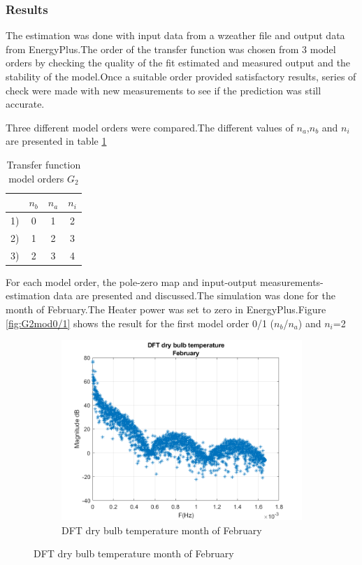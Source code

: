 \documentclass[a4paper,12pt]{report}
\numberwithin{equation}{section}
\begin{document}
\subsubsection{Results}
The estimation was done with input data from a wzeather file and output data from EnergyPlus.The order of the transfer function was chosen from 3 model orders by checking the quality of the fit estimated and measured output and the stability of the model.Once a suitable order provided satisfactory results, series of check were made with new measurements to see if the prediction was still accurate.

\noindent
Three different model orders were compared.The different values of  $n_{a}$,$n_{b}$ and $n_{i}$ are  presented in table \ref{table:model order G_{2}}

\begin{table}[H]
\centering
\begin{tabular}{|c|c|c|c|}
\hline  & $n_{b}$ & $n_{a}$ & $n_{i}$ \\
\hline 1) & 0 & 1 & 2 \\
\hline 2) & 1 & 2 & 3\\
\hline 3) & 2 & 3 & 4\\
\hline
\end{tabular}
\caption{Transfer function model orders $G_{2}$}
\label{table:model order G_{2}}
\end{table}

\noindent
For each model order, the pole-zero map and input-output measurements-estimation data  are presented and discussed.The simulation was done for the month of February.The Heater power was set to zero in EnergyPlus.Figure \ref{fig:G2mod0/1} shows the result for the first model order 0/1 ($n_{b}$/$n_{a}$) and $n_{i}$=2

\begin{figure}[H]
\centering
\begin{subfigure}{\textwidth}
  \centering
  \includegraphics[width=.6\linewidth]{Dft_drybulbFeb.png}
  \caption{DFT dry bulb temperature month of February}
  \label{fig:DFT G2mod0/1}
\end{subfigure}
\end{figure}
\clearpage
\end{document}

